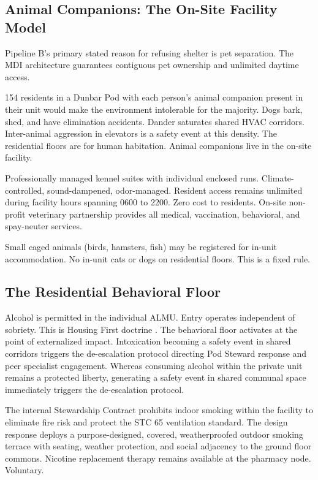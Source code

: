 \documentclass[12pt, letterpaper]{article}
\begin{document}
\subsection{Animal Companions: The On-Site Facility Model}

Pipeline B's primary stated reason for refusing shelter is pet separation. The MDI architecture guarantees contiguous pet ownership and unlimited daytime access.

154 residents in a Dunbar Pod with each person's animal companion present in their unit would make the environment intolerable for the majority. Dogs bark, shed, and have elimination accidents. Dander saturates shared HVAC corridors. Inter-animal aggression in elevators is a safety event at this density. The residential floors are for human habitation. Animal companions live in the on-site facility.

Professionally managed kennel suites with individual enclosed runs. Climate-controlled, sound-dampened, odor-managed. Resident access remains unlimited during facility hours spanning 0600 to 2200. Zero cost to residents. On-site non-profit veterinary partnership provides all medical, vaccination, behavioral, and spay-neuter services.

Small caged animals (birds, hamsters, fish) may be registered for in-unit accommodation. No in-unit cats or dogs on residential floors. This is a fixed rule.


\subsection{The Residential Behavioral Floor}

Alcohol is permitted in the individual ALMU. Entry operates independent of sobriety. This is Housing First doctrine \citep{finland_housing_first_2023}. The behavioral floor activates at the point of externalized impact. Intoxication becoming a safety event in shared corridors triggers the de-escalation protocol directing Pod Steward response and peer specialist engagement. Whereas consuming alcohol within the private unit remains a protected liberty, generating a safety event in shared communal space immediately triggers the de-escalation protocol.

The internal Stewardship Contract prohibits indoor smoking within the facility to eliminate fire risk and protect the STC 65 ventilation standard. The design response deploys a purpose-designed, covered, weatherproofed outdoor smoking terrace with seating, weather protection, and social adjacency to the ground floor commons. Nicotine replacement therapy remains available at the pharmacy node. Voluntary.
\end{document}
